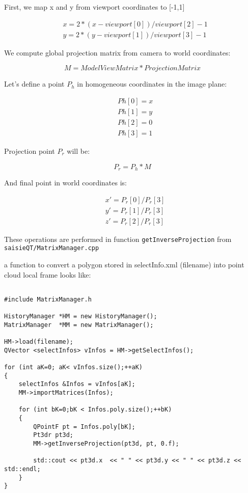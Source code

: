 First, we map x and y from viewport coordinates to [-1,1]

\begin{eqnarray*}
	& x = 2 * ( x - viewport[0] ) / viewport[2] - 1\\
    & y = 2 * ( y - viewport[1] ) / viewport[3] - 1 
\end{eqnarray*}

We compute global projection matrix from camera to world coordinates:

\begin{equation*}
	M  = ModelViewMatrix * ProjectionMatrix
\end{equation*}

Let's define a point $P_h$ in homogeneous coordinates in the image plane:

\begin{eqnarray*}
	& Ph[0] = x\\
	& Ph[1] = y\\
	& Ph[2] = 0\\
	& Ph[3] = 1
\end{eqnarray*}

Projection point $P_r$ will be:

\begin{equation*}
	P_r = P_h*M
\end{equation*}

And final point in world coordinates is:

\begin{eqnarray*}
	& x' = P_{r}[0]/P_{r}[3] \\
	& y' = P_{r}[1]/P_{r}[3] \\		
	& z' = P_{r}[2]/P_{r}[3]
\end{eqnarray*}

	
These operations are performed in function {\tt getInverseProjection} from {\tt saisieQT/MatrixManager.cpp }

a function to convert a polygon stored in selectInfo.xml (filename) into point cloud local frame looks like:

\begin{verbatim}

#include MatrixManager.h 

HistoryManager *HM = new HistoryManager();
MatrixManager  *MM = new MatrixManager();

HM->load(filename);
QVector <selectInfos> vInfos = HM->getSelectInfos();

for (int aK=0; aK< vInfos.size();++aK)
{
    selectInfos &Infos = vInfos[aK];
    MM->importMatrices(Infos);

    for (int bK=0;bK < Infos.poly.size();++bK)
    {
        QPointF pt = Infos.poly[bK];
        Pt3dr pt3d;
        MM->getInverseProjection(pt3d, pt, 0.f);

        std::cout << pt3d.x  << " " << pt3d.y << " " << pt3d.z << std::endl;
    }
}

\end{verbatim}



